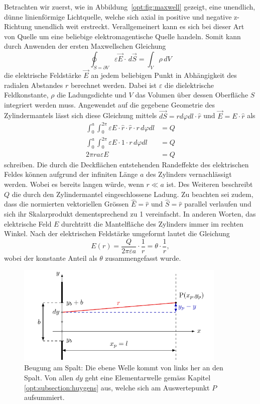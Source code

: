 Betrachten wir zuerst, wie in Abbildung~\ref{opt:fig:maxwell} gezeigt, eine unendlich, dünne linienförmige Lichtquelle, welche sich axial in positive und negative z-Richtung unendlich weit erstreckt.
Verallgemeinert kann es sich bei dieser Art von Quelle um eine beliebige elektromagentische Quelle handeln.
Somit kann durch Anwenden der ersten Maxwellschen Gleichung
\begin{equation}
\oint_{S=\partial V} \varepsilon\vec{E} \cdot\, d\vec{S}
=
\int_{V}\rho\, dV
\end{equation}
die elektrische Feldstärke $\vec{E}$ an jedem beliebigen Punkt in Abhängigkeit des radialen Abstandes $r$ berechnet werden.
Dabei ist $\varepsilon$ die dielektrische Feldkonstante, $\rho$ die Ladungsdichte und $V$ das Volumen über dessen Oberfläche $S$ integriert werden muss.
Angewendet auf die gegebene Geometrie des Zylindermantels lässt sich diese Gleichung mittels $\vec{dS} = r d\varphi dl \cdot \hat{r}$ und $\vec{E} = E \cdot \hat{r}$ als
\begin{align}
\int_{0}^{a}\int_{0}^{2\pi} \varepsilon E\cdot \hat{r} \cdot \hat{r} \cdot r\, d\varphi dl
&=
Q
\\
\int_{0}^{a}\int_{0}^{2\pi} \varepsilon E\cdot 1 \cdot r\, d\varphi dl
&=
Q
\\
2\pi ra\varepsilon E
&=
Q
\end{align}
schreiben.
Die durch die Deckflächen entstehenden Randeffekte des elektrischen Feldes können aufgrund der infiniten Länge $a$ des Zylinders vernachlässigt werden.
Wobei es bereits langen würde, wenn $r \ll a$ ist.
Des Weiteren beschreibt $Q$ die durch den Zylindermantel eingeschlossene Ladung.
Zu beachten sei zudem, dass die normierten vektoriellen Grössen $\hat{E} = \hat{r}$ und $\hat{S} = \hat{r}$ parallel verlaufen und sich ihr Skalarprodukt dementsprechend zu 1 vereinfacht.
In anderen Worten, das elektrische Feld $E$ durchtritt die Mantelfläche des Zylinders immer im rechten Winkel.
Nach der elektrischen Feldstärke umgeformt lautet die Gleichung
\begin{equation}
E(r)
=
\frac{Q}{2\pi\varepsilon a} \cdot \frac{1}{r}
=
\theta \cdot \frac{1}{r}
,
\label{opt:equation:E}
\end{equation}
wobei der konstante Anteil als $\theta$ zusammengefasst wurde.

\begin{figure}
    \centering
    \includegraphics[width=100mm]{papers/opt/images/derivation.pdf}
    \caption{Beugung am Spalt: Die ebene Welle kommt von links her an den Spalt. 
    Von allen $dy$ geht eine Elementarwelle gemäss Kapitel \ref{opt:subsection:huygens} aus, welche sich am Auswertepunkt $P$ aufsummiert.}
    \label{opt:fig:geometricalShape}
\end{figure}

